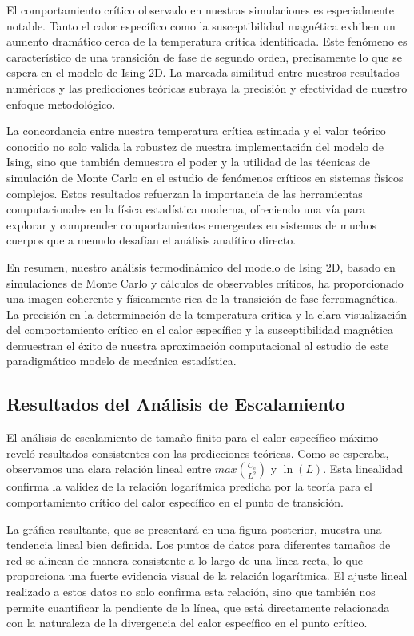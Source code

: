\documentclass[twocolumn]{article}
\begin{document}
El comportamiento crítico observado en nuestras simulaciones es especialmente notable. Tanto el calor específico como la susceptibilidad magnética exhiben un aumento dramático cerca de la temperatura crítica identificada. Este fenómeno es característico de una transición de fase de segundo orden, precisamente lo que se espera en el modelo de Ising 2D. La marcada similitud entre nuestros resultados numéricos y las predicciones teóricas subraya la precisión y efectividad de nuestro enfoque metodológico.

La concordancia entre nuestra temperatura crítica estimada y el valor teórico conocido no solo valida la robustez de nuestra implementación del modelo de Ising, sino que también demuestra el poder y la utilidad de las técnicas de simulación de Monte Carlo en el estudio de fenómenos críticos en sistemas físicos complejos. Estos resultados refuerzan la importancia de las herramientas computacionales en la física estadística moderna, ofreciendo una vía para explorar y comprender comportamientos emergentes en sistemas de muchos cuerpos que a menudo desafían el análisis analítico directo.

En resumen, nuestro análisis termodinámico del modelo de Ising 2D, basado en simulaciones de Monte Carlo y cálculos de observables críticos, ha proporcionado una imagen coherente y físicamente rica de la transición de fase ferromagnética. La precisión en la determinación de la temperatura crítica y la clara visualización del comportamiento crítico en el calor específico y la susceptibilidad magnética demuestran el éxito de nuestra aproximación computacional al estudio de este paradigmático modelo de mecánica estadística.

\subsection*{Resultados del Análisis de Escalamiento}

El análisis de escalamiento de tamaño finito para el calor específico máximo reveló resultados consistentes con las predicciones teóricas. Como se esperaba, observamos una clara relación lineal entre $max(\frac{C_v}{L^2})$ y $\ln(L)$. Esta linealidad confirma la validez de la relación logarítmica predicha por la teoría para el comportamiento crítico del calor específico en el punto de transición.

La gráfica resultante, que se presentará en una figura posterior, muestra una tendencia lineal bien definida. Los puntos de datos para diferentes tamaños de red se alinean de manera consistente a lo largo de una línea recta, lo que proporciona una fuerte evidencia visual de la relación logarítmica. El ajuste lineal realizado a estos datos no solo confirma esta relación, sino que también nos permite cuantificar la pendiente de la línea, que está directamente relacionada con la naturaleza de la divergencia del calor específico en el punto crítico.
\end{document}
